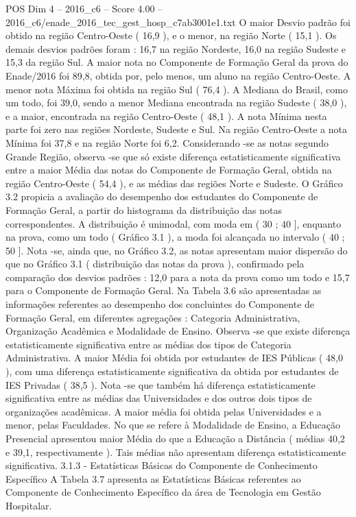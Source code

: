 \begin{textsample}{POS Dim 4 – 2016\_c6 – Score 4.00 – 2016\_c6/enade\_2016\_tec\_gest\_hosp\_c7ab3001e1.txt}
O maior Desvio padrão foi obtido na região Centro-Oeste ( 16,9 ), e o menor, na região Norte ( 15,1 ).
Os demais desvios padrões foram : 16,7 na região Nordeste, 16,0 na região Sudeste e 15,3 da região Sul.
A maior nota no Componente de Formação Geral da prova do Enade/2016 foi 89,8, obtida por, pelo menos, um aluno na região Centro-Oeste.
A menor nota Máxima foi obtida na região Sul ( 76,4 ).
A Mediana do Brasil, como um todo, foi 39,0, sendo a menor Mediana encontrada na região Sudeste ( 38,0 ), e a maior, encontrada na região Centro-Oeste ( 48,1 ).
A nota Mínima nesta parte foi zero nas regiões Nordeste, Sudeste e Sul.
Na região Centro-Oeste a nota Mínima foi 37,8 e na região Norte foi 6,2.
Considerando -se as notas segundo Grande Região, observa -se que só existe diferença estatisticamente significativa entre a maior Média das notas do Componente de Formação Geral, obtida na região Centro-Oeste ( 54,4 ), e as médias das regiões Norte e Sudeste.
O Gráfico 3.2 propicia a avaliação do desempenho dos estudantes do Componente de Formação Geral, a partir do histograma da distribuição das notas correspondentes.
A distribuição é unimodal, com moda em ( 30 ; 40 ], enquanto na prova, como um todo ( Gráfico 3.1 ), a moda foi alcançada no intervalo ( 40 ; 50 ].
Nota -se, ainda que, no Gráfico 3.2, as notas apresentam maior dispersão do que no Gráfico 3.1 ( distribuição das notas da prova ), confirmado pela comparação dos desvios padrões : 12,0 para a nota da prova como um todo e 15,7 para o Componente de Formação Geral.
Na Tabela 3.6 são apresentadas as informações referentes ao desempenho dos concluintes do Componente de Formação Geral, em diferentes agregações : Categoria Administrativa, Organização Acadêmica e Modalidade de Ensino.
Observa -se que existe diferença estatisticamente significativa entre as médias dos tipos de Categoria Administrativa.
A maior Média foi obtida por estudantes de IES Públicas ( 48,0 ), com uma diferença estatisticamente significativa da obtida por estudantes de IES Privadas ( 38,5 ).
Nota -se que também há diferença estatisticamente significativa entre as médias das Universidades e dos outros dois tipos de organizações acadêmicas.
A maior média foi obtida pelas Universidades e a menor, pelas Faculdades.
No que se refere à Modalidade de Ensino, a Educação Presencial apresentou maior Média do que a Educação a Distância ( médias 40,2 e 39,1, respectivamente ).
Tais médias não apresentam diferença estatisticamente significativa. 3.1.3 - Estatísticas Básicas do Componente de Conhecimento Específico A Tabela 3.7 apresenta as Estatísticas Básicas referentes ao Componente de Conhecimento Específico da área de Tecnologia em Gestão Hospitalar.

\end{textsample}
